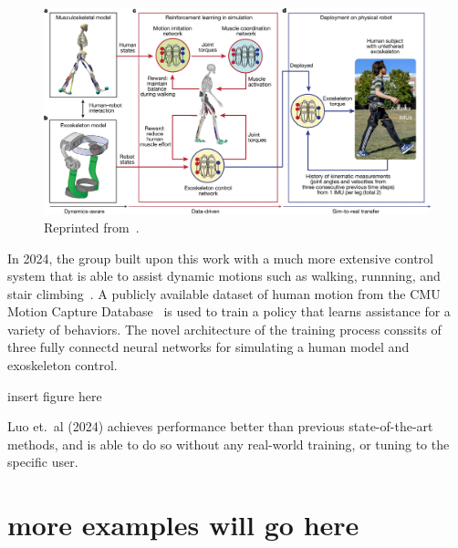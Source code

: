 \documentclass[12pt]{report}
\theoremstyle{definition}
\theoremstyle{remark}
\begin{document}
\begin{figure}[H]
    \centering
    \includegraphics[width=\linewidth]{figs/exoskeleton.png}
    \caption{Reprinted from~\cite{luo_experiment-free_2024}.}
    \label{fig:luo2021}
\end{figure}

In 2024, the group built upon this work with a much more extensive control system that is able to assist dynamic motions such as walking, runnning, and stair climbing~\cite{luo_experiment-free_2024}. A publicly available dataset of human motion from the CMU Motion Capture Database~\cite{noauthor_cmu_nodate} is used to train a policy that learns assistance for a variety of behaviors. The novel architecture of the training process conssits of three fully connectd neural networks for simulating a human model and exoskeleton control.

insert figure here

Luo et.\ al (2024) achieves performance better than previous state-of-the-art methods, and is able to do so without any real-world training, or tuning to the specific user.


\section{more examples will go here}
\end{document}
